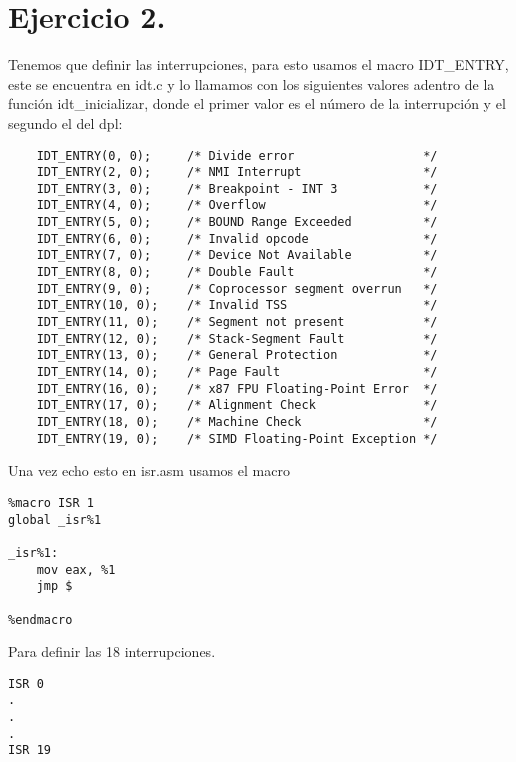 \section*{Ejercicio 2.}

\noindent Tenemos que definir las interrupciones, para esto usamos el macro IDT\_ENTRY, este se encuentra en idt.c y lo llamamos con los siguientes valores adentro de la función idt\_inicializar, donde el primer valor es el número de la interrupción y el segundo el del dpl:

\begin{codesnippet}
\begin{verbatim}
    IDT_ENTRY(0, 0);     /* Divide error                  */
    IDT_ENTRY(2, 0);     /* NMI Interrupt                 */
    IDT_ENTRY(3, 0);     /* Breakpoint - INT 3            */
    IDT_ENTRY(4, 0);     /* Overflow                      */
    IDT_ENTRY(5, 0);     /* BOUND Range Exceeded          */
    IDT_ENTRY(6, 0);     /* Invalid opcode                */
    IDT_ENTRY(7, 0);     /* Device Not Available          */
    IDT_ENTRY(8, 0);     /* Double Fault                  */
    IDT_ENTRY(9, 0);     /* Coprocessor segment overrun   */
    IDT_ENTRY(10, 0);    /* Invalid TSS                   */
    IDT_ENTRY(11, 0);    /* Segment not present           */
    IDT_ENTRY(12, 0);    /* Stack-Segment Fault           */
    IDT_ENTRY(13, 0);    /* General Protection            */
    IDT_ENTRY(14, 0);    /* Page Fault                    */
    IDT_ENTRY(16, 0);    /* x87 FPU Floating-Point Error  */
    IDT_ENTRY(17, 0);    /* Alignment Check               */
    IDT_ENTRY(18, 0);    /* Machine Check                 */
    IDT_ENTRY(19, 0);    /* SIMD Floating-Point Exception */
\end{verbatim}
\end{codesnippet}

\noindent Una vez echo esto en isr.asm usamos el macro 

\begin{codesnippet}
\begin{verbatim}
%macro ISR 1
global _isr%1

_isr%1:
    mov eax, %1
    jmp $

%endmacro
\end{verbatim}
\end{codesnippet}

\noindent Para definir las 18 interrupciones.

\begin{codesnippet}
\begin{verbatim}
ISR 0
.
.
.
ISR 19
\end{verbatim}
\end{codesnippet}


